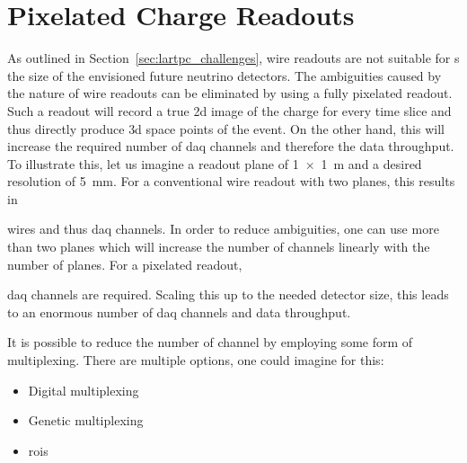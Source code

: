 \section{Pixelated Charge Readouts}
\label{sec:studies_pixel-ro}

As outlined in Section~\ref{sec:lartpc_challenges}, wire readouts are not suitable for \lartpc{}s the size of the envisioned future neutrino detectors.
The ambiguities caused by the nature of wire readouts can be eliminated by using a fully pixelated readout.
Such a readout will record a true \gls{2d} image of the charge for every time slice and thus directly produce \gls{3d} space points of the event.
On the other hand, this will increase the required number of \gls{daq} channels and therefore the data throughput.
To illustrate this, let us imagine a readout plane of \SI{1 x 1}{\metre} and a desired resolution of \SI{5}{\milli\metre}.
For a conventional wire readout with two planes, this results in


wires and thus \gls{daq} channels.
In order to reduce ambiguities, one can use more than two planes which will increase the number of channels linearly with the number of planes.
For a pixelated readout,


\gls{daq} channels are required.
Scaling this up to the needed detector size, this leads to an enormous number of \gls{daq} channels and data throughput.

It is possible to reduce the number of channel by employing some form of multiplexing.
There are multiple options, one could imagine for this:
\begin{itemize}
	\item Digital multiplexing
	\item Genetic multiplexing
	\item \glspl{roi}
\end{itemize}

